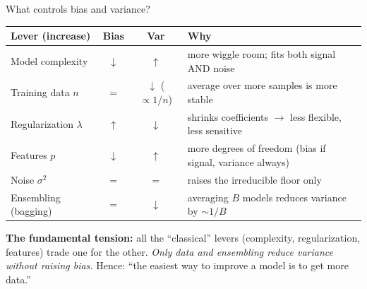 \documentclass[aspectratio=169]{beamer}
\begin{document}
\begin{frame}{What controls bias and variance?}
  \begin{center}\small
    \begin{tabular}{p{3.8cm} c c p{5.5cm}}
      \textbf{Lever (increase)} & \textbf{Bias} & \textbf{Var} & \textbf{Why} \\ \hline
      Model complexity & $\downarrow$ & $\uparrow$ & more wiggle room; fits both signal AND noise \\
      Training data $n$ & $=$ & $\downarrow$ ($\propto 1/n$) & average over more samples is more stable \\
      Regularization $\lambda$ & $\uparrow$ & $\downarrow$ & shrinks coefficients $\to$ less flexible, less sensitive \\
      Features $p$ & $\downarrow$ & $\uparrow$ & more degrees of freedom (bias if signal, variance always) \\
      Noise $\sigma^2$ & $=$ & $=$ & raises the irreducible floor only \\
      Ensembling (bagging) & $=$ & $\downarrow$ & averaging $B$ models reduces variance by $\sim 1/B$ \\
    \end{tabular}
  \end{center}
  \vfill
  \textbf{The fundamental tension:} all the ``classical'' levers (complexity, regularization, features) trade one for the other. \emph{Only data and ensembling reduce variance without raising bias.} Hence: ``the easiest way to improve a model is to get more data.''
\end{frame}
\end{document}
